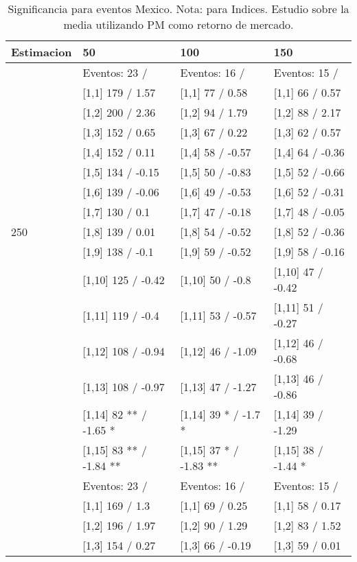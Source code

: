 \begin{table}

\caption{Significancia para eventos Mexico. Nota: para Indices. Estudio sobre la media utilizando PM como retorno de mercado.}
\centering
\begin{tabular}[t]{llll}
\toprule
Estimacion & 50 & 100 & 150\\
\midrule
 & Eventos:  23 / & Eventos:  16 / & Eventos:  15 /\\
 & {}[1,1] 179  / 1.57 & {}[1,1] 77  / 0.58 & {}[1,1] 66  / 0.57\\
 & {}[1,2] 200  / 2.36 & {}[1,2] 94  / 1.79 & {}[1,2] 88  / 2.17\\
 & {}[1,3] 152  / 0.65 & {}[1,3] 67  / 0.22 & {}[1,3] 62  / 0.57\\
 & {}[1,4] 152  / 0.11 & {}[1,4] 58  / -0.57 & {}[1,4] 64  / -0.36\\
\addlinespace
 & {}[1,5] 134  / -0.15 & {}[1,5] 50  / -0.83 & {}[1,5] 52  / -0.66\\
 & {}[1,6] 139  / -0.06 & {}[1,6] 49  / -0.53 & {}[1,6] 52  / -0.31\\
 & {}[1,7] 130  / 0.1 & {}[1,7] 47  / -0.18 & {}[1,7] 48  / -0.05\\
250 & {}[1,8] 139  / 0.01 & {}[1,8] 54  / -0.52 & {}[1,8] 52  / -0.36\\
 & {}[1,9] 138  / -0.1 & {}[1,9] 59  / -0.52 & {}[1,9] 58  / -0.16\\
\addlinespace
 & {}[1,10] 125  / -0.42 & {}[1,10] 50  / -0.8 & {}[1,10] 47  / -0.42\\
 & {}[1,11] 119  / -0.4 & {}[1,11] 53  / -0.57 & {}[1,11] 51  / -0.27\\
 & {}[1,12] 108  / -0.94 & {}[1,12] 46  / -1.09 & {}[1,12] 46  / -0.68\\
 & {}[1,13] 108  / -0.97 & {}[1,13] 47  / -1.27 & {}[1,13] 46  / -0.86\\
 & {}[1,14] 82 ** / -1.65 * & {}[1,14] 39 * / -1.7 * & {}[1,14] 39  / -1.29\\
\addlinespace
 & {}[1,15] 83 ** / -1.84 ** & {}[1,15] 37 * / -1.83 ** & {}[1,15] 38  / -1.44 *\\
 & Eventos:  23 / & Eventos:  16 / & Eventos:  15 /\\
 & {}[1,1] 169  / 1.3 & {}[1,1] 69  / 0.25 & {}[1,1] 58  / 0.17\\
 & {}[1,2] 196  / 1.97 & {}[1,2] 90  / 1.29 & {}[1,2] 83  / 1.52\\
 & {}[1,3] 154  / 0.27 & {}[1,3] 66  / -0.19 & {}[1,3] 59  / 0.01\\

\end{tabular}
\end{table}
